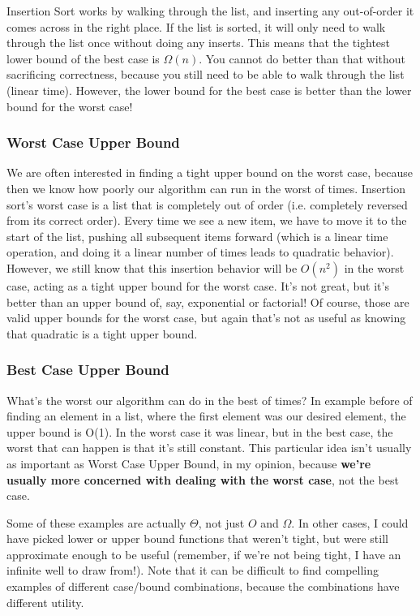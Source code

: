 \documentclass[en,hazy,blue,screen,14pt]{elegantnote}
\begin{document}
Insertion Sort works by walking through the list, and inserting any
out-of-order it comes across in the right place. If the list is sorted,
it will only need to walk through the list once without doing any
inserts. This means that the tightest lower bound of the best case
is $\Omega(n)$. You cannot do better than that without sacrificing
correctness, because you still need to be able to walk through the
list (linear time). However, the lower bound for the best case is
better than the lower bound for the worst case!

\subsubsection*{Worst Case Upper Bound}

We are often interested in finding a tight upper bound on the worst
case, because then we know how poorly our algorithm can run in the
worst of times. Insertion sort's worst case is a list that is completely
out of order (i.e. completely reversed from its correct order). Every
time we see a new item, we have to move it to the start of the list,
pushing all subsequent items forward (which is a linear time operation,
and doing it a linear number of times leads to quadratic behavior).
However, we still know that this insertion behavior will be $O(n^{2})$
in the worst case, acting as a tight upper bound for the worst case.
It's not great, but it's better than an upper bound of, say, exponential
or factorial! Of course, those are valid upper bounds for the worst
case, but again that's not as useful as knowing that quadratic is
a tight upper bound.

\subsubsection*{Best Case Upper Bound}

What's the worst our algorithm can do in the best of times? In example
before of finding an element in a list, where the first element was
our desired element, the upper bound is O(1). In the worst case it
was linear, but in the best case, the worst that can happen is that
it's still constant. This particular idea isn't usually as important
as Worst Case Upper Bound, in my opinion, because \textbf{we're usually
more concerned with dealing with the worst case}, not the best case.

Some of these examples are actually $\Theta$, not just $O$ and $\Omega$.
In other cases, I could have picked lower or upper bound functions
that weren't tight, but were still approximate enough to be useful
(remember, if we're not being tight, I have an infinite well to draw
from!). Note that it can be difficult to find compelling examples
of different case/bound combinations, because the combinations have
different utility.
\end{document}
